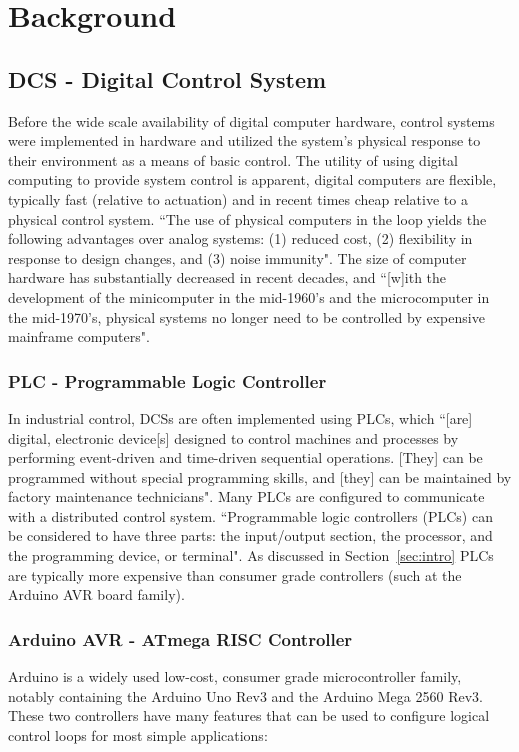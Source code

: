\documentclass[../main.tex]{subfiles}
\begin{document}
\section{Background}
\label{sec:background}

\subsection{DCS - Digital Control System}
\label{sec:dcs_background}
Before the wide scale availability of digital computer hardware, control systems were implemented in hardware and utilized the system's physical response to their environment as a means of basic control\cite[p~4-6]{controls}. The utility of using digital computing to provide system control is apparent, digital computers are flexible, typically fast (relative to actuation) and in recent times cheap relative to a physical control system. ``The use of physical computers in the loop yields the following advantages over analog systems: (1) reduced cost, (2) flexibility in response to design changes, and (3) noise immunity"\cite[p.~579]{controls}. The size of computer hardware has substantially decreased in recent decades, and ``[w]ith the development of the minicomputer in the mid-1960's and the microcomputer in the mid-1970's, physical systems no longer need to be controlled by expensive mainframe computers"\cite[p.~578]{controls}.
\subsubsection{PLC - Programmable Logic Controller}
\label{sec:plc}
In industrial control, DCSs are often implemented using PLCs, which ``[are] digital, electronic device[s] designed to control machines and processes by performing event-driven and time-driven sequential operations. [They] can be programmed without special programming skills, and [they] can be maintained by factory maintenance technicians"\cite[p.~432]{control_sys_tech}. Many PLCs are configured to communicate with a distributed control system\cite[p.~395]{industrial_control}. ``Programmable logic controllers (PLCs) can be considered to have three parts: the input/output section, the processor, and the programming device, or terminal"\cite[p.~76]{modern_industrial}. As discussed in Section~\ref{sec:intro} PLCs are typically more expensive than consumer grade controllers (such at the Arduino AVR board family).

\subsubsection{Arduino AVR - ATmega RISC Controller}
\label{sec:avr}
Arduino is a widely used low-cost, consumer grade microcontroller family, notably containing the Arduino Uno Rev3\cite{uno} and the Arduino Mega 2560 Rev3\cite{mega}. These two controllers have many features that can be used to configure logical control loops for most simple applications:
\end{document}
